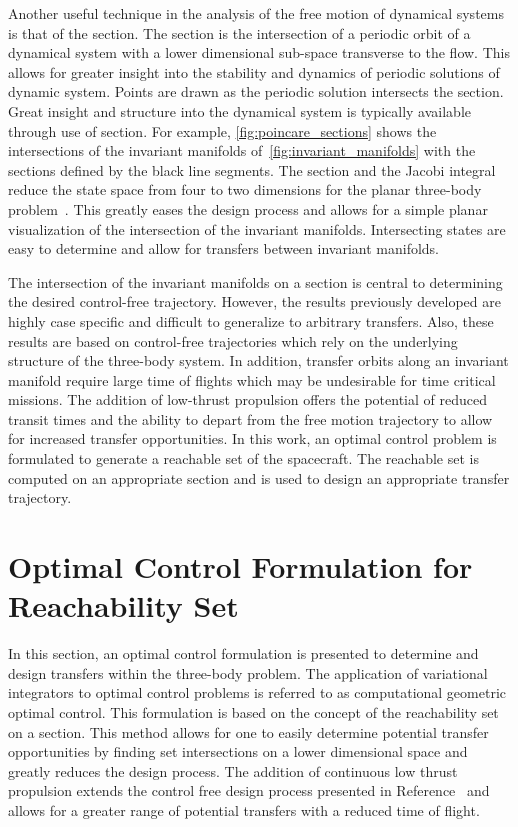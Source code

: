 Another useful technique in the analysis of the free motion of dynamical systems is that of the \Poincare section.
The \Poincare section is the intersection of a periodic orbit of a dynamical system with a lower dimensional sub-space transverse to the flow.
This allows for greater insight into the stability and dynamics of periodic solutions of dynamic system. 
Points are drawn as the periodic solution intersects the \Poincare section.
Great insight and structure into the dynamical system is typically available through use of \Poincare section.
For example, \cref{fig:poincare_sections} shows the intersections of the invariant manifolds of~\cref{fig:invariant_manifolds} with the \Poincare sections defined by the black line segments.
The \Poincare section and the Jacobi integral reduce the state space from four to two dimensions for the planar three-body problem~\cite{koon2001}.
This greatly eases the design process and allows for a simple planar visualization of the intersection of the invariant manifolds.
Intersecting states are easy to determine and allow for transfers between invariant manifolds.

The intersection of the invariant manifolds on a \Poincare section is central to determining the desired control-free trajectory.
However, the results previously developed are highly case specific and difficult to generalize to arbitrary transfers.
Also, these results are based on control-free trajectories which rely on the underlying structure of the three-body system.
In addition, transfer orbits along an invariant manifold require large time of flights which may be undesirable for time critical missions.
The addition of low-thrust propulsion offers the potential of reduced transit times and the ability to depart from the free motion trajectory to allow for increased transfer opportunities. 
In this work, an optimal control problem is formulated to generate a reachable set of the spacecraft.
The reachable set is computed on an appropriate \Poincare section and is used to design an appropriate transfer trajectory.
\section{Optimal Control Formulation for Reachability Set}\label{sec:optimal_control}
In this section, an optimal control formulation is presented to determine and design transfers within the three-body problem.
The application of variational integrators to optimal control problems is referred to as computational geometric optimal control.
This formulation is based on the concept of the reachability set on a \Poincare section.
This method allows for one to easily determine potential transfer opportunities by finding set intersections on a lower dimensional space and greatly reduces the design process.
The addition of continuous low thrust propulsion extends the control free design process presented in Reference~\cite{koon2000} and allows for a greater range of potential transfers with a reduced time of flight.

